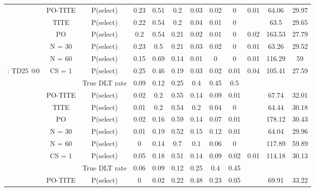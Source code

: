 \begin{table}
\begin{singlespace}
{\begin{tabular}[t]{cccccccccccc}
			& PO-TITE & P(select) & 0.23 & 0.51 & 0.2 & 0.03 & 0.02 & 0 & 0.01 & 64.06 & 29.97\\
			
			& TITE & P(select) & 0.22 & 0.54 & 0.2 & 0.04 & 0.01 & 0 &  & 63.5 & 29.65\\
			
			& PO & P(select) & 0.2 & 0.54 & 0.21 & 0.02 & 0.01 & 0 & 0.02 & 163.53 & 27.79\\
			
			& N = 30 & P(select) & 0.23 & 0.5 & 0.21 & 0.03 & 0.02 & 0 & 0.01 & 63.26 & 29.52\\
			
			& N = 60 & P(select) & 0.15 & 0.69 & 0.14 & 0.01 & 0 & 0 & 0.01 & 116.29 & 59\\
			
			\multirow{-7}{*}{\centering\arraybackslash 2: TD25 @0} & CS = 1 & P(select) & 0.25 & 0.46 & 0.19 & 0.03 & 0.02 & 0.01 & 0.04 & 105.41 & 27.59\\
			\cmidrule{1-12}
			\rowcolor{gray!6}   &  & True DLT rate & 0.09 & 0.12 & 0.25 & 0.4 & 0.45 & 0.5 &  &  & \\
			
			\rowcolor{gray!6}   & PO-TITE & P(select) & 0.02 & 0.2 & 0.55 & 0.14 & 0.09 & 0.01 &  & 67.74 & 32.01\\
			
			\rowcolor{gray!6}   & TITE & P(select) & 0.01 & 0.2 & 0.54 & 0.2 & 0.04 & 0 &  & 64.44 & 30.18\\
			
			\rowcolor{gray!6}   & PO & P(select) & 0.02 & 0.16 & 0.59 & 0.14 & 0.07 & 0.01 &  & 178.12 & 30.43\\
			
			\rowcolor{gray!6}   & N = 30 & P(select) & 0.01 & 0.19 & 0.52 & 0.15 & 0.12 & 0.01 &  & 64.04 & 29.96\\
			
			\rowcolor{gray!6}   & N = 60 & P(select) & 0 & 0.14 & 0.7 & 0.1 & 0.06 & 0 &  & 117.89 & 59.89\\
			
			\rowcolor{gray!6}  \multirow{-7}{*}{\centering\arraybackslash 3: TD25 @1} & CS = 1 & P(select) & 0.05 & 0.18 & 0.51 & 0.14 & 0.09 & 0.02 & 0.01 & 114.18 & 30.13\\
			\cmidrule{1-12}
			&  & True DLT rate & 0.06 & 0.09 & 0.12 & 0.25 & 0.4 & 0.45 &  &  & \\
			
			& PO-TITE & P(select) & 0 & 0.02 & 0.22 & 0.48 & 0.23 & 0.05 &  & 69.91 & 33.22\\
			

\end{tabular}}
\end{singlespace}
\end{table}
